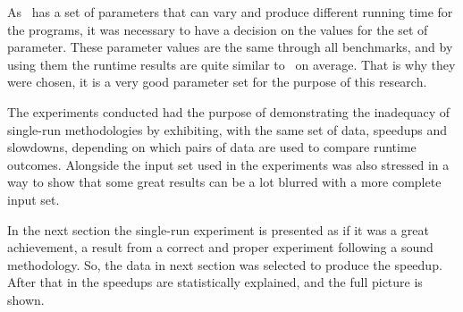 As \FDI\ has a set of parameters that can vary and produce different running time for the programs, it was necessary to have a decision on the values for the set of parameter. These parameter values are the same through all benchmarks, and by using them the runtime results are quite similar to \llvm\ on average. That is why they were chosen, it is a very good parameter set for the purpose of this research.


The experiments conducted had the purpose of demonstrating the inadequacy of single-run methodologies by exhibiting, with the same set of data, speedups and slowdowns, depending on which pairs of data are used to compare runtime outcomes. Alongside the input set used in the experiments was also stressed in a way to show that some great results can be a lot blurred with a more complete input set.

In the next section the single-run experiment is presented as if it was a great achievement, a result from a correct and proper experiment following a sound methodology. So, the data in next section was selected to produce the speedup. After that in  the speedups are statistically explained, and the full picture is shown.
